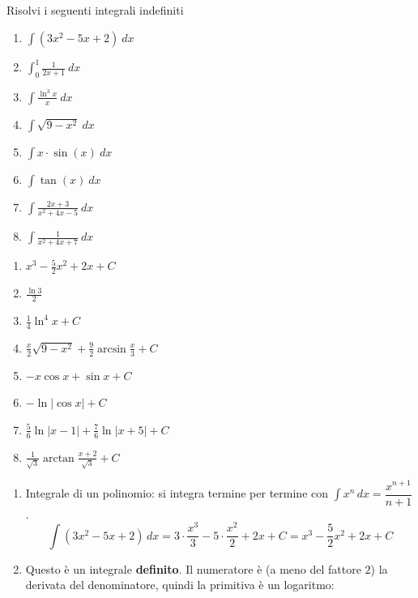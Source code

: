 \begin{question}[ID=1.1, subtitle={Integrali indefiniti — serie 1}, tags={integrali, indefiniti}, difficulty=media]
Risolvi i seguenti integrali indefiniti

\begin{center}\begin{minipage}{0.7\linewidth}
\begin{enumerate}
\item $\int (3x^2 - 5x + 2) \ dx$
\item $\int_{0}^{1} \frac{1}{2x+1} \ dx$
\item $\int \frac{\ln^3 x}{x} \ dx$
\item $\int \sqrt{9 - x^2} \ dx$
\item $\int x \cdot \sin(x) \ dx$
\item $\int \tan(x) \ dx$
\item $\int \frac{2x + 3}{x^2 + 4x - 5} \ dx$
\item $\int \frac{1}{x^2 + 4x + 7} \ dx$
\end{enumerate}
\end{minipage}\end{center}
\begin{solution}
\begin{enumerate}
    \item $x^3-\tfrac52x^2+2x+C$
    \item $\tfrac{\ln3}{2}$
    \item $\tfrac14\ln^4x+C$
    \item $\tfrac x2\sqrt{9-x^2}+\tfrac92\arcsin\tfrac x3+C$
    \item $-x\cos x+\sin x+C$
    \item $-\ln|\cos x|+C$
    \item $\tfrac56\ln|x-1|+\tfrac76\ln|x+5|+C$
    \item $\tfrac{1}{\sqrt3}\arctan\tfrac{x+2}{\sqrt3}+C$
\end{enumerate}
\end{solution}
\begin{explanation}
\begin{enumerate}
    \item Integrale di un polinomio: si integra termine per termine con $\int x^n\,dx=\dfrac{x^{n+1}}{n+1}$.
    \[ \int(3x^2-5x+2)\,dx=3\cdot\dfrac{x^3}{3}-5\cdot\dfrac{x^2}{2}+2x+C=x^3-\dfrac52x^2+2x+C \]
    \item Questo è un integrale \textbf{definito}. Il numeratore è (a meno del fattore $2$) la derivata del denominatore, quindi la primitiva è un logaritmo:

\end{enumerate}
\end{explanation}
\end{question}
